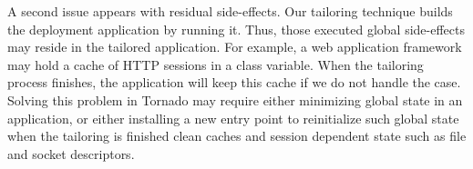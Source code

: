 A second issue appears with residual side-effects. Our tailoring technique builds the deployment application by running it. Thus, those executed global side-effects may reside in the tailored application. For example, a web application framework may hold a cache of HTTP sessions in a class variable. When the tailoring process finishes, the application will keep this cache if we do not handle the case. Solving this problem in Tornado may require either minimizing global state in an application, or either installing a new entry point to reinitialize such global state when the tailoring is finished \eg clean caches and session dependent state such as file and socket descriptors.


%


%

